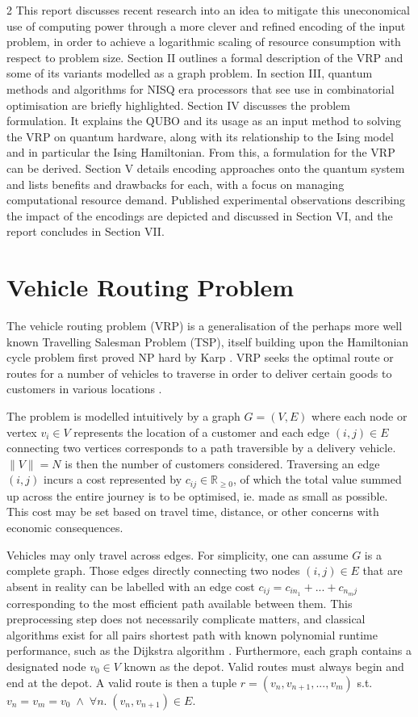 \documentclass [10pt]{article}
\newcommand {\qnorm}[1] {\lVert #1 \rVert}
\begin{document}
\begin {multicols}{2}
This report discusses recent research into an idea to mitigate this
uneconomical use of computing power through a more clever and refined 
encoding of the input problem, in order to achieve a logarithmic scaling of
resource consumption with respect to problem size.
Section II outlines a formal description of the VRP and some of its variants
modelled as a graph problem.
In section III, quantum methods and algorithms for NISQ era processors that
see use in combinatorial optimisation are briefly highlighted.
Section IV discusses the problem formulation. It explains the QUBO and
its usage as an input method to solving the VRP on quantum hardware, along
with its relationship to the Ising model and in particular the
Ising Hamiltonian. From this, a formulation for the VRP can be derived.
Section V details encoding approaches onto the quantum system and lists
benefits and drawbacks for each, with a focus on managing computational
resource demand.
Published experimental observations describing the impact of the encodings
are depicted and discussed in Section VI,
and the report concludes in Section VII.

\section {Vehicle Routing Problem}
The vehicle routing problem (VRP) is a generalisation of the perhaps more
well known Travelling Salesman Problem (TSP), itself building upon the
Hamiltonian cycle problem first proved NP hard by Karp \cite{karp21}. VRP seeks
the optimal route or routes for a number of vehicles to traverse in order to
deliver certain goods to customers in various locations \cite{vrpintro}.

The problem is modelled intuitively by a graph $G = (V, E)$
where each node or vertex $v_i \in V$ represents the location of a customer 
and each edge $(i, j) \in E$ connecting two vertices corresponds to a path
traversible by a delivery vehicle. $\qnorm{V} = N$ is then the number
of customers considered. Traversing an edge $(i, j)$ incurs
a cost represented by $c_{ij} \in \mathbb R_{\ge 0}$, of which the total
value summed up across the entire journey is to be optimised, ie. made as
small as possible. This cost may be set based on travel time, distance,
or other concerns with economic consequences.

Vehicles may only travel across edges. For simplicity, one can assume $G$ is
a complete graph. Those edges directly connecting two nodes $(i, j) \in E$
that are absent in reality can be labelled with an edge cost
$c_{ij} = c_{i n_1} + ... + c_{n_m j}$ corresponding to
the most efficient path available between them. This preprocessing step does
not necessarily complicate matters, and classical algorithms exist for all
pairs shortest path with known polynomial runtime performance, such as
the Dijkstra algorithm \cite{dijkstra}. Furthermore, each graph contains a
designated node $v_0 \in V$ known as the depot. Valid routes must always
begin and end at the depot. A valid route is then a tuple
$r = (v_n, v_{n+1}, ..., v_m)$ s.t.
$v_n = v_m = v_0 \; \land \; \forall n. \; (v_n, v_{n+1}) \in E$.


\end{multicols}
\end{document}
